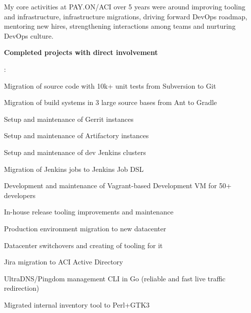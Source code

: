 \documentclass[letterpaper,11pt]{article}
\newcommand{\resumeItem}[2]{
  \item\small{
    \textbf{#1}{: #2 \vspace{-2pt}}
  }
}
\begin{document}
		My core activities at PAY.ON/ACI over 5 years were around improving tooling and infrastructure, infrastructure migrations, driving forward DevOps roadmap, mentoring new hires, strengthening interactions among teams and nurturing DevOps culture.
         
        \resumeItem{Completed projects with direct involvement}
          {
          
          Migration of source code with 10k+ unit tests from Subversion to Git
          
          Migration of build systems in 3 large source bases from Ant to Gradle

          Setup and maintenance of Gerrit instances
          
          Setup and maintenance of Artifactory instances
          
          Setup and maintenance of dev Jenkins clusters
          
          Migration of Jenkins jobs to Jenkins Job DSL
          
          Development and maintenance of Vagrant-based Development VM for 50+ developers
          
          In-house release tooling improvements and maintenance
          
          Production environment migration to new datacenter
          
          Datacenter switchovers and creating of tooling for it
          
          Jira migration to ACI Active Directory
          
          UltraDNS/Pingdom management CLI in Go (reliable and fast live traffic redirection)
          
          Migrated internal inventory tool to Perl+GTK3
         
		}
		
\end{document}
